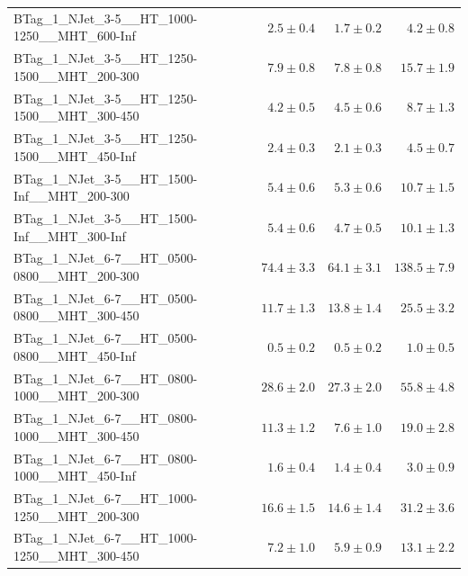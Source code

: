 \documentclass{beamer}
\begin{document}
\begin{frame}
\begin{tabular}{lrrr}
      BTag\_1\_NJet\_3-5\_\_HT\_1000-1250\_\_MHT\_600-Inf &               $2.5\pm0.4$&               $1.7\pm0.2$&                   $4.2\pm0.8$ \\ 
      BTag\_1\_NJet\_3-5\_\_HT\_1250-1500\_\_MHT\_200-300 &               $7.9\pm0.8$&               $7.8\pm0.8$&                  $15.7\pm1.9$ \\ 
      BTag\_1\_NJet\_3-5\_\_HT\_1250-1500\_\_MHT\_300-450 &               $4.2\pm0.5$&               $4.5\pm0.6$&                   $8.7\pm1.3$ \\ 
      BTag\_1\_NJet\_3-5\_\_HT\_1250-1500\_\_MHT\_450-Inf &               $2.4\pm0.3$&               $2.1\pm0.3$&                   $4.5\pm0.7$ \\ 
       BTag\_1\_NJet\_3-5\_\_HT\_1500-Inf\_\_MHT\_200-300 &               $5.4\pm0.6$&               $5.3\pm0.6$&                  $10.7\pm1.5$ \\ 
       BTag\_1\_NJet\_3-5\_\_HT\_1500-Inf\_\_MHT\_300-Inf &               $5.4\pm0.6$&               $4.7\pm0.5$&                  $10.1\pm1.3$ \\ 
      BTag\_1\_NJet\_6-7\_\_HT\_0500-0800\_\_MHT\_200-300 &              $74.4\pm3.3$&              $64.1\pm3.1$&                 $138.5\pm7.9$ \\ 
      BTag\_1\_NJet\_6-7\_\_HT\_0500-0800\_\_MHT\_300-450 &              $11.7\pm1.3$&              $13.8\pm1.4$&                  $25.5\pm3.2$ \\ 
      BTag\_1\_NJet\_6-7\_\_HT\_0500-0800\_\_MHT\_450-Inf &               $0.5\pm0.2$&               $0.5\pm0.2$&                   $1.0\pm0.5$ \\ 
      BTag\_1\_NJet\_6-7\_\_HT\_0800-1000\_\_MHT\_200-300 &              $28.6\pm2.0$&              $27.3\pm2.0$&                  $55.8\pm4.8$ \\ 
      BTag\_1\_NJet\_6-7\_\_HT\_0800-1000\_\_MHT\_300-450 &              $11.3\pm1.2$&               $7.6\pm1.0$&                  $19.0\pm2.8$ \\ 
      BTag\_1\_NJet\_6-7\_\_HT\_0800-1000\_\_MHT\_450-Inf &               $1.6\pm0.4$&               $1.4\pm0.4$&                   $3.0\pm0.9$ \\ 
      BTag\_1\_NJet\_6-7\_\_HT\_1000-1250\_\_MHT\_200-300 &              $16.6\pm1.5$&              $14.6\pm1.4$&                  $31.2\pm3.6$ \\ 
      BTag\_1\_NJet\_6-7\_\_HT\_1000-1250\_\_MHT\_300-450 &               $7.2\pm1.0$&               $5.9\pm0.9$&                  $13.1\pm2.2$ \\ 

\end{tabular}
\end{frame}
\end{document}
